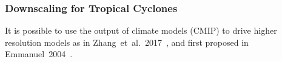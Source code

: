 \subsubsection{Downscaling for Tropical Cyclones}

It is possible to use the output of climate models (CMIP)
to drive higher resolution models as in Zhang~et~al.~2017~\cite{zhang2017response},
and first proposed in Emmanuel~2004~\cite{emanuel2008hurricanes}.
